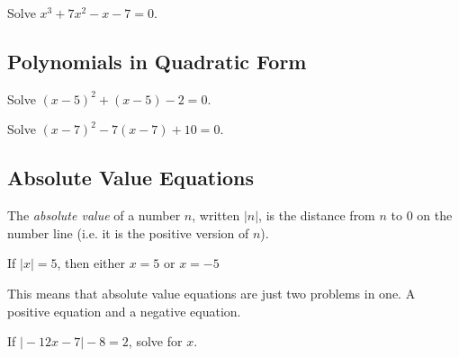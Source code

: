 \begin{exercise}
Solve $x^3+7x^2-x-7=0$.
\end{exercise}
\begin{solution}[2.2in]

\end{solution}
\vspace{0.5em}

\newpage
\subsection{Polynomials in Quadratic Form}

\begin{exercise}
Solve $(x-5)^2+(x-5)-2=0$.
\end{exercise}
\begin{solution}[4in]

\end{solution}
\vspace{0.5em}

\begin{exercise}
Solve $(x-7)^2-7(x-7)+10=0$.
\end{exercise}
\begin{solution}[3in]

\end{solution}
\vspace{0.5em}

\newpage
\subsection{Absolute Value Equations}
\begin{definition}\label{def: absolute value}
The \emph{absolute value} of a number $n$, written $\vert n\vert$, is the
distance from $n$ to $0$ on the number line (i.e. it is the positive version of $n$).
\end{definition}

\begin{example}
If $\vert x\vert=5$, then either $x=5$ or $x=-5$
\end{example}

This means that absolute value equations are just two problems in one. A positive equation and a negative equation.

\begin{exercise}
If $\vert-12x-7\vert-8=2$, solve for $x$.
\end{exercise}
\begin{solution}[3.5in]

\end{solution}
\vspace{0.5em}

